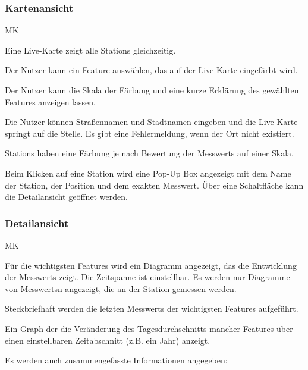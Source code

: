 \subsubsection*{\gls{Kartenansicht}}
\begin{Kriterien}{MK}

	\item Eine \gls{Live-Karte} zeigt alle \glspl{Station} gleichzeitig. 
	
	\item Der Nutzer kann ein \gls{Feature} auswählen, das auf der \gls{Live-Karte} eingefärbt wird.
	
	\item Der Nutzer kann die Skala der Färbung und eine kurze Erklärung des gewählten \gls{Feature}s anzeigen lassen.
	
	\item Die Nutzer können Straßennamen und Stadtnamen eingeben und die \gls{Live-Karte} springt auf die Stelle. Es gibt eine Fehlermeldung, wenn der Ort nicht existiert.

	\item \glspl{Station} haben eine Färbung je nach Bewertung der \glspl{Messwert} auf einer Skala.
	
	\item Beim Klicken auf eine \gls{Station} wird eine \gls{Pop-Up} Box angezeigt mit dem Name der Station, der Position und dem exakten \gls{Messwert}.
		Über eine Schaltfläche kann die \gls{Detailansicht} geöffnet werden. 
\end{Kriterien}

\subsubsection*{\gls{Detailansicht}}
\begin{Kriterien}{MK}
	\item Für die wichtigsten \glspl{Feature} wird ein Diagramm angezeigt, das die Entwicklung der \glspl{Messwert} zeigt. Die Zeitspanne ist einstellbar. Es werden nur Diagramme von \glspl{Messwert}n angezeigt, die an der \gls{Station} gemessen werden.
	
	\item Steckbriefhaft werden die letzten \glspl{Messwert} der wichtigsten \glspl{Feature} aufgeführt.

	\item Ein \gls{Graph} der die Veränderung des Tagesdurchschnitts mancher \glspl{Feature} über einen einstellbaren Zeitabschnitt (z.B. ein Jahr) anzeigt.
	
	\item Es werden auch zusammengefasste Informationen angegeben: 
\end{Kriterien}
		
